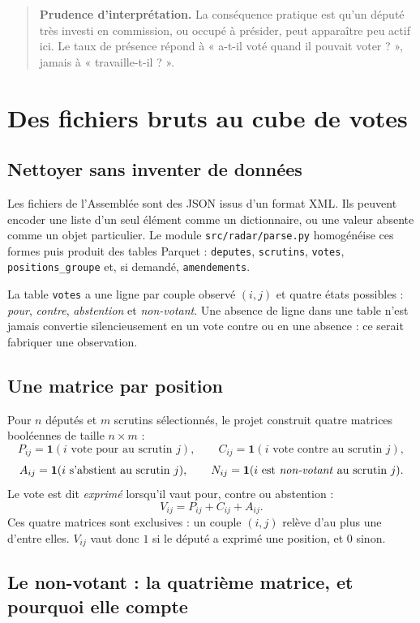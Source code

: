 \documentclass[11pt,a4paper]{article}
\newcommand{\ind}{\mathbf{1}}
\newcommand{\code}[1]{\texttt{#1}}
\newcommand{\prudence}[1]{\begin{quote}\small\color{red!55!black}\textbf{Prudence d'interprétation.} #1\end{quote}}
\begin{document}
\prudence{La conséquence pratique est qu'un député très investi en commission,
ou occupé à présider, peut apparaître peu actif ici. Le taux de présence répond
à « a-t-il voté quand il pouvait voter ? », jamais à « travaille-t-il ? ».}

\section{Des fichiers bruts au cube de votes}\label{sec:cube}

\subsection{Nettoyer sans inventer de données}

Les fichiers de l'Assemblée sont des JSON issus d'un format XML. Ils peuvent
encoder une liste d'un seul élément comme un dictionnaire, ou une valeur absente
comme un objet particulier. Le module \code{src/radar/parse.py} homogénéise ces
formes puis produit des tables Parquet : \code{deputes}, \code{scrutins},
\code{votes}, \code{positions\_groupe} et, si demandé, \code{amendements}.

La table \code{votes} a une ligne par couple observé $(i,j)$ et quatre états
possibles : \emph{pour}, \emph{contre}, \emph{abstention} et \emph{non-votant}.
Une absence de ligne dans une table n'est jamais convertie silencieusement en
un vote contre ou en une absence : ce serait fabriquer une observation.

\subsection{Une matrice par position}

Pour $n$ députés et $m$ scrutins sélectionnés, le projet construit quatre
matrices booléennes de taille $n\times m$ :
\[
 P_{ij}=\ind(\text{$i$ vote pour au scrutin $j$}),\qquad
 C_{ij}=\ind(\text{$i$ vote contre au scrutin $j$}),
\]
\[
 A_{ij}=\ind(\text{$i$ s'abstient au scrutin $j$}),\qquad
 N_{ij}=\ind(\text{$i$ est \emph{non-votant} au scrutin $j$}).
\]
Le vote est dit \emph{exprimé} lorsqu'il vaut pour, contre ou abstention :
\[
 V_{ij}=P_{ij}+C_{ij}+A_{ij}.
\]
Ces quatre matrices sont exclusives : un couple $(i,j)$ relève d'au plus une
d'entre elles. $V_{ij}$ vaut donc $1$ si le député a exprimé une position, et
$0$ sinon.

\subsection{Le non-votant : la quatrième matrice, et pourquoi elle compte}
\label{sec:nonvotant}
\end{document}
